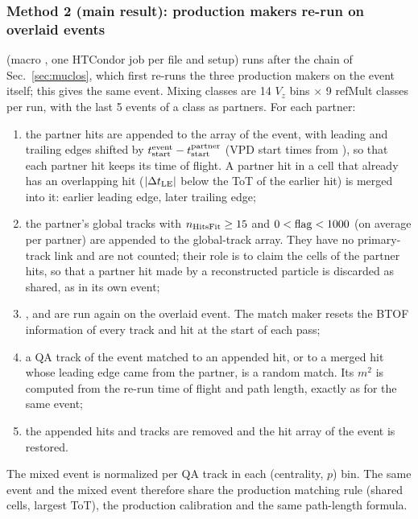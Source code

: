 \subsubsection{Method 2 (main result): production makers re-run on overlaid events}
\label{sec:muov}
 (macro , one HTCondor job per file and setup) runs after
the chain of Sec.~\ref{sec:muclos}, which first re-runs the three production makers on the event itself; this gives the same
event. Mixing classes are 14 $V_z$ bins $\times$ 9 refMult classes per run, with the last 5 events of a class as partners.
For each partner:
\begin{enumerate}
\item the partner hits are appended to the  array of the event, with leading and trailing edges shifted
  by $t_{\rm start}^{\rm event}-t_{\rm start}^{\rm partner}$ (VPD start times from ), so that each
  partner hit keeps its time of flight. A partner hit in a cell that already has an overlapping hit
  ($|\Delta t_{\rm LE}|$ below the ToT of the earlier hit) is merged into it: earlier leading edge, later trailing edge;
\item the partner's global tracks with $n_{\rm HitsFit}\ge15$ and $0<{\rm flag}<1000$ (on average \ovtNTrkAdd{} per partner)
  are appended to the global-track array. They have no primary-track link and are not counted; their role is to claim the
  cells of the partner hits, so that a partner hit made by a reconstructed particle is discarded as shared, as in its own
  event;
\item {},  and  are run again on the overlaid event.
  The match maker resets the BTOF information of every track and hit at the start of each pass;
\item a QA track of the event matched to an appended hit, or to a merged hit whose leading edge came from the partner, is a
  random match. Its $m^2$ is computed from the re-run time of flight and path length, exactly as for the same event;
\item the appended hits and tracks are removed and the hit array of the event is restored.
\end{enumerate}
The mixed event is normalized per QA track in each (centrality, $p$) bin. The same event and the mixed event therefore share
the production matching rule (shared cells, largest ToT), the production calibration and the same path-length formula.

